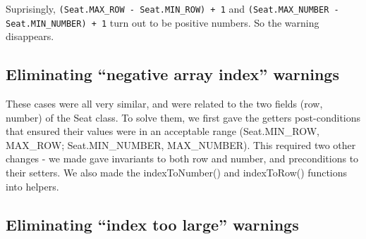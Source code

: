 \documentclass{article}
\begin{document}
Suprisingly, \verb|(Seat.MAX_ROW - Seat.MIN_ROW) + 1| and \verb|(Seat.MAX_NUMBER - Seat.MIN_NUMBER) + 1| turn
out to be positive numbers. So the warning disappears.

\subsection{Eliminating ``negative array index'' warnings}

These cases were all very similar, and were related to the two fields (row, number) of the Seat class. To solve them, we first gave the getters post-conditions that ensured their values were in an acceptable range (Seat.MIN\_ROW, MAX\_ROW; Seat.MIN\_NUMBER, MAX\_NUMBER). This required two other changes - we made gave invariants to both row and number, and preconditions to their setters. We also made the indexToNumber() and indexToRow() functions into helpers.

\subsection{Eliminating ``index too large'' warnings}
\end{document}
